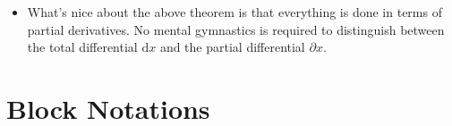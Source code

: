 \documentclass[10pt]{article}
\newcommand{\dee}{\mathrm{d}}
\newcommand{\ve}[1]{\mathbf{#1}}
\begin{document}
\begin{itemize}
\begin{proof}
\begin{align*}
\begin{bmatrix}
        \nabla_2 f_i(\ve{g}(\ve{x})) &
        \cdots &
        \nabla_n f_i(\ve{g}(\ve{x}))
      \end{bmatrix}
      \begin{bmatrix}
        \nabla_j g_1(\ve{x}) \\
        \nabla_j g_2(\ve{x}) \\
        \vdots \\
        \nabla_j g_n(\ve{x}).
      \end{bmatrix} \\
      &= \sum_{k=1}^n \nabla_k f_i(\ve{g}(\ve{x})) \nabla_j g_k(\ve{x}).
    \end{align*}
    as required.
  \end{proof}

  \item What's nice about the above theorem is that everything is done in terms of partial derivatives. No mental gymnastics is required to distinguish between the total differential $\dee x$ and the partial differential $\partial x$.
\end{itemize}

\section{Block Notations}
\end{document}
